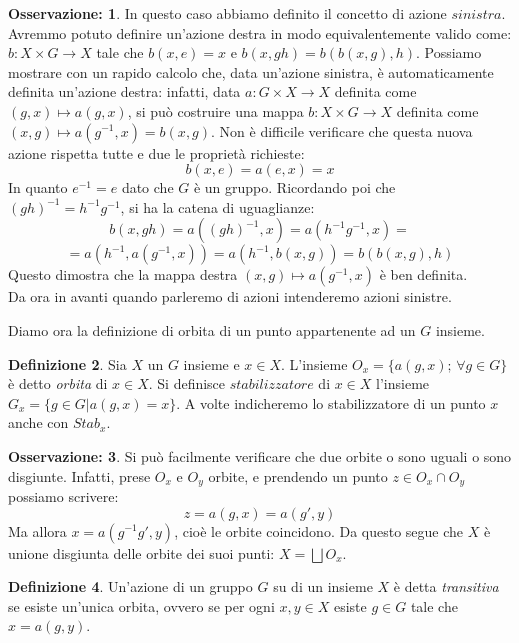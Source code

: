 \documentclass[12pt,a4paper]{report}
\theoremstyle{definition}
\newtheorem{Def}{Definizione}[chapter]
\theoremstyle{Theorem}
\theoremstyle{definition}
\theoremstyle{definition}
\theoremstyle{definition}
\newtheorem{Obs}[Def]{Osservazione:}
\begin{document}
\begin{Obs}
In questo caso abbiamo definito il concetto di azione $\textit{sinistra}$. Avremmo potuto definire un'azione destra in modo equivalentemente valido come: $b:X\times G\rightarrow X$ tale che $b(x,e)=x$ e $b(x,gh)=b(b(x,g),h)$. Possiamo mostrare con un rapido calcolo che, data un'azione sinistra, è automaticamente definita un'azione destra: infatti, data $a:G\times X\rightarrow X$ definita come $(g,x)\longmapsto a(g,x)$, si può costruire una mappa $b:X\times G\rightarrow X$ definita come $(x,g)\longmapsto a(g^{-1},x)=b(x,g)$. Non è difficile verificare che questa nuova azione rispetta tutte e due le proprietà richieste:
$$b(x,e)=a(e,x)=x$$
In quanto $e^{-1}=e$ dato che $G$ è un gruppo. Ricordando poi che $(gh)^{-1}=h^{-1}g^{-1}$, si ha la catena di uguaglianze:
$$b(x,gh)=a((gh)^{-1},x)=a(h^{-1}g^{-1},x)=$$$$=a(h^{-1},a(g^{-1},x))=a(h^{-1},b(x,g))=b(b(x,g),h)$$
Questo dimostra che la mappa destra $(x,g)\longmapsto a(g^{-1},x)$ è ben definita.\\
Da ora in avanti quando parleremo di azioni intenderemo azioni sinistre.
\end{Obs}
Diamo ora la definizione di orbita di un punto appartenente ad un $G$ insieme.
\begin{Def}
	Sia $X$ un $G$ insieme e $x\in X$. L'insieme $O_x=\{a(g,x); \, \forall g\in G\}$ è detto \textit{orbita} di $x\in X$. Si definisce $\textit{stabilizzatore}$ di $x\in X$ l'insieme $G_x=\{g\in G|a(g,x)=x\}$. A volte indicheremo lo stabilizzatore di un punto $x$ anche con $Stab_x$.
\end{Def}
\begin{Obs} \label{Obs: 2.1}
	Si può facilmente verificare che due orbite o sono uguali o sono disgiunte. Infatti, prese $O_x$ e $O_y$ orbite, e prendendo un punto $z\in O_x\cap O_y$ possiamo scrivere:
	$$z=a(g,x)=a(g',y)$$
	Ma allora $x=a(g^{-1}g',y)$, cioè le orbite coincidono.
	Da questo segue che $X$ è unione disgiunta delle orbite dei suoi punti: $X=\bigsqcup O_x$.
\end{Obs}
\begin{Def}
	Un'azione di un gruppo $G$ su di un insieme $X$ è detta \textit{transitiva} se esiste un'unica orbita, ovvero se per ogni $x,y\in X$ esiste $g\in G$ tale che $x=a(g,y)$.
\end{Def}
\end{document}
